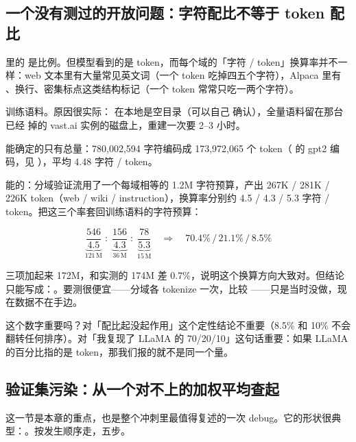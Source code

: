 \subsection{一个没有测过的开放问题：字符配比不等于 token 配比}
\label{subsec:char-vs-token}

 里的  是比例。但模型看到的是 token，而每个域的「字符 / token」换算率并不一样：web 文本里有大量常见英文词（一个 token 吃掉四五个字符），Alpaca 里有 \code{\#\#\#}、换行、密集标点这类结构标记（一个 token 常常只吃一两个字符）。

训练语料。原因很实际： 在本地是空目录（可以自己  确认），全量语料留在那台已经  掉的 vast.ai 实例的磁盘上，重建一次要 2--3 小时。

能确定的只有总量：780{,}002{,}594 字符编码成 173{,}972{,}065 个 token（ 的 gpt2 编码，见 ），平均 4.48 字符 / token。

能的：分域验证流用了一个每域相等的 1.2M 字符预算，产出 267K / 281K / 226K token（web / wiki / instruction），换算率分别约 4.5 / 4.3 / 5.3 字符 / token。把这三个率套回训练语料的字符预算：

\[
\underbrace{\frac{546}{4.5}}_{121\,\mathrm{M}} \;:\;
\underbrace{\frac{156}{4.3}}_{36\,\mathrm{M}} \;:\;
\underbrace{\frac{78}{5.3}}_{15\,\mathrm{M}}
\quad\Longrightarrow\quad 70.4\% \,/\, 21.1\% \,/\, 8.5\%
\]

三项加起来 172M，和实测的 174M 差 0.7\%，说明这个换算方向大致对。但结论只能写成：。要测很便宜——分域各 tokenize 一次，比较 ——只是当时没做，现在数据不在手边。

这个数字重要吗？对「配比起没起作用」这个定性结论不重要（8.5\% 和 10\% 不会翻转任何排序）。对「我复现了 LLaMA 的 70/20/10」这句话重要：如果 LLaMA 的百分比指的是 token，那我们报的就不是同一个量。

\subsection{验证集污染：从一个对不上的加权平均查起}
\label{subsec:contamination}

这一节是本章的重点，也是整个冲刺里最值得复述的一次 debug。它的形状很典型：。按发生顺序走，五步。

